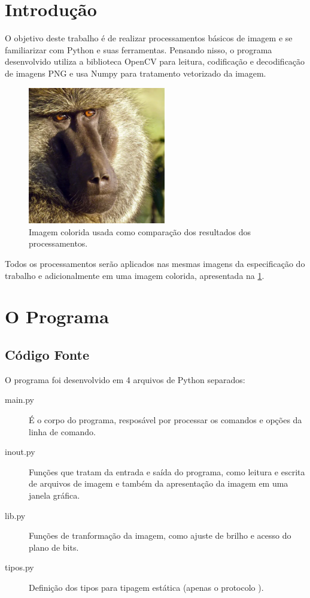 \section{Introdução}

O objetivo deste trabalho é de realizar processamentos básicos de imagem e se familiarizar com Python e suas ferramentas. Pensando nisso, o programa desenvolvido utiliza a biblioteca OpenCV para leitura, codificação e decodificação de imagens PNG e usa Numpy para tratamento vetorizado da imagem.

\begin{figure}[H]
    \centering
    \includegraphics[width=6cm]{imagens/color.png}

    \caption{Imagem colorida usada como comparação dos resultados dos processamentos.}
    \label{fig:color}
\end{figure}

Todos os processamentos serão aplicados nas mesmas imagens da especificação do trabalho e adicionalmente em uma imagem colorida, apresentada na \cref{fig:color}.

\section{O Programa}

\subsection{Código Fonte}

O programa foi desenvolvido em 4 arquivos de Python separados:

\begin{description}
    \item[main.py] É o corpo do programa, resposável por processar os comandos e opções da linha de comando.

    \item[inout.py] Funções que tratam da entrada e saída do programa, como leitura e escrita de arquivos de imagem e também da apresentação da imagem em uma janela gráfica.

    \item[lib.py] Funções de tranformação da imagem, como ajuste de brilho e acesso do plano de bits.

    \item[tipos.py] Definição dos tipos para tipagem estática (apenas o protocolo \autocite{ref:pep544} ).
\end{description}

